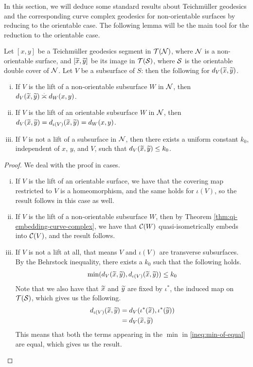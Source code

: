\documentclass[12pt, reqno]{amsart}
\begin{document}
In this section, we will deduce some standard results about Teichmüller geodesics and the corresponding curve complex geodesics for non-orientable surfaces by reducing to the orientable case.
The following lemma will be the main tool for the reduction to the orientable case.
\begin{lemma}
  \label{lem:lifting-subsurfaces}
  Let $[x, y]$ be a Teichmüller geodesics segment in $\mathcal{T}(\mathcal{N})$, where $\mathcal{N}$ is a non-orientable surface, and $[\widetilde{x}, \widetilde{y}]$ be its image in $\mathcal{T}(\mathcal{S})$, where $\mathcal{S}$ is the orientable double cover of $\mathcal{N}$.
  Let $V$ be a subsurface of $S$: then the following for $d_V(\widetilde{x}, \widetilde{y})$.
  \begin{enumerate}[(i)]
  \item If $V$ is the lift of a non-orientable subsurface $W$ in $\mathcal{N}$, then $d_V(\wt{x}, \wt{y}) \emul d_W(x, y)$.
  \item If $V$ is the lift of an orientable subsurface $W$ in $\mathcal{N}$, then $d_V(\widetilde{x}, \widetilde{y}) = d_{\iota(V)}(\widetilde{x}, \widetilde{y}) = d_W(x, y)$.
  \item If $V$ is not a lift of a subsurface in $\mathcal{N}$, then there exists a uniform constant $k_0$, independent of $x$, $y$, and $V$, such that $d_V(\widetilde{x}, \widetilde{y}) \leq k_0$.
  \end{enumerate}
\end{lemma}
\begin{proof}
  We deal with the proof in cases.
  \begin{enumerate}[(i)]
  \item If $V$ is the lift of an orientable surface, we have that the covering map restricted to $V$ is a homeomorphism, and the same holds for $\iota(V)$, so the result follows in this case as well.
  \item If $V$ is the lift of a non-orientable subsurface $W$, then by Theorem \ref{thm:qi-embedding-curve-complex}, we have that $\mathcal{C}(W)$ quasi-isometrically embeds into $\mathcal{C}(V)$, and the result follows.
  \item If $V$ is not a lift at all, that means $V$ and $\iota(V)$ are transverse subsurfaces.
    By the Behrstock inequality, there exists a $k_0$ such that the following holds.
    \begin{align}
      \label{ineq:min-of-equal}
      \min(d_V(\widetilde{x}, \widetilde{y}), d_{\iota(V)}(\widetilde{x}, \widetilde{y})) \leq k_0
    \end{align}
    Note that we also have that $\widetilde{x}$ and $\widetilde{y}$ are fixed by $\iota^{\ast}$, the induced map on $\mathcal{T}(\mathcal{S})$, which gives us the following.
    \begin{align*}
      d_{\iota(V)}(\widetilde{x}, \widetilde{y}) &= d_{V}(\iota^{\ast}(\widetilde{x}), \iota^{\ast}(\widetilde{y})) \\
                                   &= d_V(\widetilde{x}, \widetilde{y})
    \end{align*}
    This means that both the terms appearing in the $\min$ in \eqref{ineq:min-of-equal} are equal, which gives us the result.
  \end{enumerate}
\end{proof}
\end{document}
